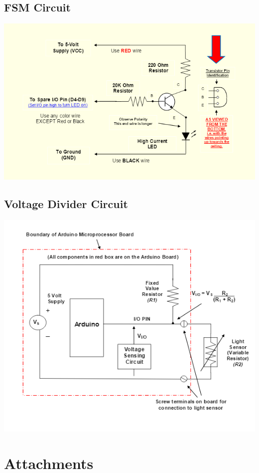 \documentclass{article}
\begin{document}
\subsection{FSM Circuit}
\includegraphics[width=\textwidth]{FSMSchematic.png}
\subsection{Voltage Divider Circuit}
\includegraphics[width=\textwidth]{Photoresistor.png}

\newpage
\setcounter{page}{1}
\renewcommand{\thepage}{A-\arabic{page}}
\section{Attachments}
\end{document}

